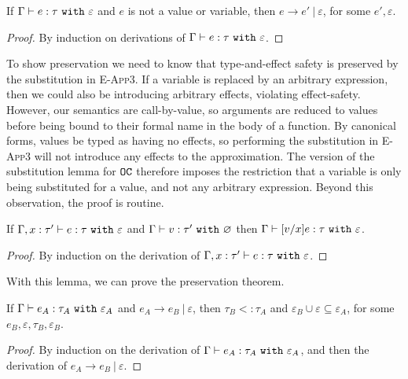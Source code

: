 \begin{theorem}
If $ \Gamma \vdash  e:  \tau~\mathtt{with}~ \varepsilon$ and $ e$ is not a value or variable, then $ e \longrightarrow  e'~|~\varepsilon$, for some $e', \varepsilon$.
\end{theorem}

\begin{proof} By induction on derivations of $ \Gamma \vdash  e:  \tau~\mathtt{with}~ \varepsilon$.
\end{proof}

To show preservation we need to know that type-and-effect safety is preserved by the substitution in \textsc{E-App3}. If a variable is replaced by an arbitrary expression, then we could also be introducing arbitrary effects, violating effect-safety. However, our semantics are call-by-value, so arguments are reduced to values before being bound to their formal name in the body of a function. By canonical forms, values be typed as having no effects, so performing the substitution in \textsc{E-App3} will not introduce any effects to the approximation. The version of the substitution lemma for $\mathtt{OC}$ therefore imposes the restriction that a variable is only being substituted for a value, and not any arbitrary expression. Beyond this observation, the proof is routine.

\begin{lemma}
If $\Gamma, x: \tau' \vdash e: \tau~\mathtt{with}~ \varepsilon$ and $\Gamma \vdash v: \tau'~\mathtt{with}~ \varnothing$ then $\Gamma \vdash [v/x]e: \tau~\mathtt{with}~ \varepsilon$.
\end{lemma}

\begin{proof} By induction on the derivation of $\Gamma, x: \tau' \vdash e: \tau~\mathtt{with}~ \varepsilon$.
\end{proof}

With this lemma, we can prove the preservation theorem.

\begin{theorem}
If $\Gamma \vdash e_A: \tau_A~\mathtt{with}~ \varepsilon_A$ and $e_A \longrightarrow e_B~|~\varepsilon$, then $\tau_B <: \tau_A$ and $\varepsilon_B \cup \varepsilon \subseteq \varepsilon_A$, for some $e_B, \varepsilon, \tau_B, \varepsilon_B$.
\end{theorem}

\begin{proof}  By induction on the derivation of $\Gamma \vdash e_A: \tau_A~\mathtt{with}~ \varepsilon_A$, and then the derivation of $e_A \longrightarrow e_B~|~\varepsilon$.
\end{proof}


